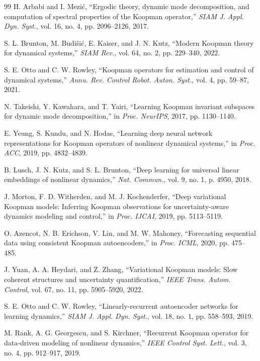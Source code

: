 \documentclass[journal]{IEEEtran}
\begin{document}
\begin{thebibliography}{99}
H. Arbabi and I. Mezi\'c, ``Ergodic theory, dynamic mode decomposition, and computation of spectral properties of the Koopman operator,'' \emph{SIAM J. Appl. Dyn. Syst.}, vol. 16, no. 4, pp. 2096--2126, 2017.

S. L. Brunton, M. Budi\v{s}i\'c, E. Kaiser, and J. N. Kutz, ``Modern Koopman theory for dynamical systems,'' \emph{SIAM Rev.}, vol. 64, no. 2, pp. 229--340, 2022.

S. E. Otto and C. W. Rowley, ``Koopman operators for estimation and control of dynamical systems,'' \emph{Annu. Rev. Control Robot. Auton. Syst.}, vol. 4, pp. 59--87, 2021.

N. Takeishi, Y. Kawahara, and T. Yairi, ``Learning Koopman invariant subspaces for dynamic mode decomposition,'' in \emph{Proc. NeurIPS}, 2017, pp. 1130--1140.

E. Yeung, S. Kundu, and N. Hodas, ``Learning deep neural network representations for Koopman operators of nonlinear dynamical systems,'' in \emph{Proc. ACC}, 2019, pp. 4832--4839.

B. Lusch, J. N. Kutz, and S. L. Brunton, ``Deep learning for universal linear embeddings of nonlinear dynamics,'' \emph{Nat. Commun.}, vol. 9, no. 1, p. 4950, 2018.

J. Morton, F. D. Witherden, and M. J. Kochenderfer, ``Deep variational Koopman models: Inferring Koopman observations for uncertainty-aware dynamics modeling and control,'' in \emph{Proc. IJCAI}, 2019, pp. 5113--5119.

O. Azencot, N. B. Erichson, V. Lin, and M. W. Mahoney, ``Forecasting sequential data using consistent Koopman autoencoders,'' in \emph{Proc. ICML}, 2020, pp. 475--485.

J. Yuan, A. A. Heydari, and Z. Zhang, ``Variational Koopman models: Slow coherent structures and uncertainty quantification,'' \emph{IEEE Trans. Autom. Control}, vol. 67, no. 11, pp. 5905--5920, 2022.

S. E. Otto and C. W. Rowley, ``Linearly-recurrent autoencoder networks for learning dynamics,'' \emph{SIAM J. Appl. Dyn. Syst.}, vol. 18, no. 1, pp. 558--593, 2019.

M. Rank, A. G. Georgescu, and S. Kirchner, ``Recurrent Koopman operator for data-driven modeling of nonlinear dynamics,'' \emph{IEEE Control Syst. Lett.}, vol. 3, no. 4, pp. 912--917, 2019.


\end{thebibliography}
\end{document}
